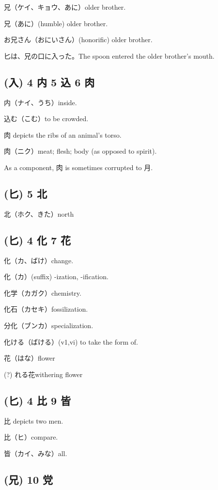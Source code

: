 兄（ケイ、キョウ、あに）older brother.

兄（あに）(humble) older brother.

お兄さん（おにいさん）(honorific) older brother.

匕は、兄の口に入った。The spoon entered the older brother's mouth.

\subsection{(入) 4 内 5 込 6 肉}

内（ナイ、うち）inside.

込む（こむ）to be crowded.

肉 depicts the ribs of an animal's torso.

肉（ニク）meat; flesh; body (as opposed to spirit).

As a component, 肉 is sometimes corrupted to 月.

\subsection{(匕) 5 北}

北（ホク、きた）north

\subsection{(匕) 4 化 7 花}

化（カ、ばけ）change.

化（カ）(suffix) -ization, -ification.

化学（カガク）chemistry.

化石（カセキ）fossilization.

分化（ブンカ）specialization.

化ける（ばける）(v1,vi) to take the form of.

花（はな）flower

(?) れる花withering flower

\subsection{(匕) 4 比 9 皆}

比 depicts two men.

比（ヒ）compare.

皆（カイ、みな）all.

\subsection{(兄) 10 党}

